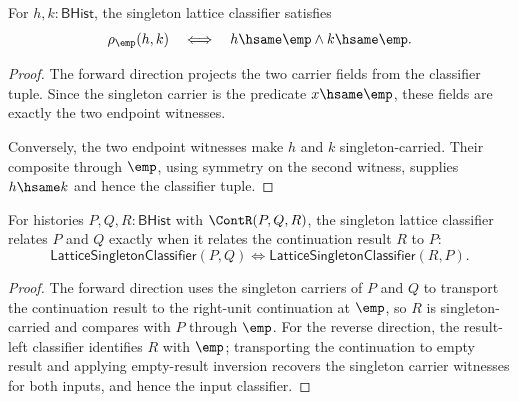 \begin{theorem}
\label{thm:lattice-singleton-classifier-empty-endpoints}
For $h,k:\mathsf{BHist}$, the singleton lattice classifier satisfies
$$
\rho_{\emp}(h,k)
\quad\Longleftrightarrow\quad
h\hsame\emp\land k\hsame\emp.
$$
\end{theorem}
\begin{proof}
The forward direction projects the two carrier fields from the classifier
tuple. Since the singleton carrier is the predicate $x\hsame\emp$, these fields
are exactly the two endpoint witnesses.

Conversely, the two endpoint witnesses make $h$ and $k$ singleton-carried.
Their composite through $\emp$, using symmetry on the second witness, supplies
$h\hsame k$ and hence the classifier tuple.
\end{proof}

\begin{theorem}
\label{thm:lattice-singleton-classifier-continuation-result-left}
For histories $P,Q,R:\mathsf{BHist}$ with $\ContR(P,Q,R)$, the singleton
lattice classifier relates $P$ and $Q$ exactly when it relates the
continuation result $R$ to $P$:
$$
\mathsf{LatticeSingletonClassifier}(P,Q)
\Longleftrightarrow
\mathsf{LatticeSingletonClassifier}(R,P).
$$
\end{theorem}
\begin{proof}
The forward direction uses the singleton carriers of $P$ and $Q$ to transport
the continuation result to the right-unit continuation at $\emp$, so $R$ is
singleton-carried and compares with $P$ through $\emp$. For the reverse
direction, the result-left classifier identifies $R$ with $\emp$; transporting
the continuation to empty result and applying empty-result inversion recovers
the singleton carrier witnesses for both inputs, and hence the input
classifier.
\end{proof}

